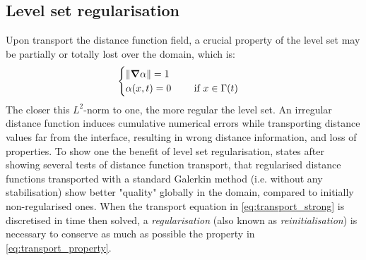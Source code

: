 \subsection{Level set regularisation}
%
Upon transport the distance function field, a crucial property of the level set may be partially or totally 
lost over the domain, which is:
\begin{align}
\label{eq:transport_property}
\begin{cases}
\lVert \boldsymbol{\nabla} \alpha \rVert = 1 \\ 
\alpha (x,t) = 0 	\qquad  \text{ if } x \in \Gamma(t)
\end{cases}
\end{align}
The closer this $L^2$-norm to one, the more regular the level set. An irregular distance function induces 
cumulative numerical errors while transporting distance values far from the interface,
resulting in wrong distance information, and loss of properties. 
To show one the benefit of level set regularisation, \citet{basset_simulation_2006} states 
after showing several tests of distance function transport, that
regularised distance functions transported with a standard Galerkin method (i.e. without any stabilisation) 
show better "quality" globally in the domain, compared to initially non-regularised ones.
When the transport equation in \cref{eq:transport_strong} is discretised in time then solved, a \emph{regularisation} 
(also known as \emph{reinitialisation}) is necessary to conserve as much as 
possible the property in \cref{eq:transport_property}.


